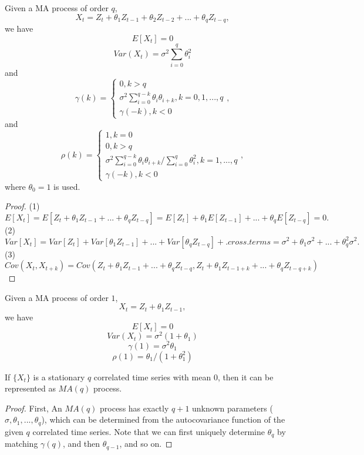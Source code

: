 \begin{theorem}\cite[33]{chatfield2003analysis}
Given a MA process of order $q$,
$$X_t = Z_t + \theta_1 Z_{t-1} + \theta_2 Z_{t-2} + ... + \theta_q Z_{t-q},$$
 we have 
$$E[X_t] = 0$$
$$Var(X_t) = \sigma^2 \sum_{i=0}^q \theta_i^2$$
and
$$\gamma(k) = \begin{cases} 
0,k>q\\
\sigma^2 \sum_{i=0}^{q-k}\theta_i\theta_{i+k},k=0,1,...,q\\
\gamma(-k),k<0
\end{cases},$$
and
$$\rho(k) = \begin{cases} 
1, k=0\\
0,k>q\\
\sigma^2 \sum_{i=0}^{q-k}\theta_i\theta_{i+k}/\sum_{i=0}^q \theta_i^2,k=1,...,q\\
\gamma(-k),k<0
\end{cases},$$
where $\theta_0 = 1$ is used.
\end{theorem}
\begin{proof}
(1) 
$$E[X_t] = E[Z_t + \theta_1 Z_{t-1} + ... + \theta_q Z_{t-q}] = E[Z_t] + \theta_1 E[Z_{t-1}] +  ... + \theta_q E[Z_{t-q}] = 0.$$
(2) $$Var[X_t] = Var[Z_t] + Var[\theta_1Z_{t-1}] + ... + Var[\theta_q Z_{t-q}] + .cross.terms = \sigma^2+\theta_1\sigma^2 + ... + \theta_q^2\sigma^2.$$
(3) $$Cov(X_t,X_{t+k}) = Cov(Z_t + \theta_1 Z_{t-1} + ... + \theta_q Z_{t-q},Z_t + \theta_1 Z_{t-1 + k} + ... + \theta_q Z_{t-q + k})$$
\end{proof}

\begin{corollary}
Given a MA process of order $1$,
$$X_t = Z_t + \theta_1 Z_{t-1},$$
we have 
$$E[X_t] = 0$$
$$Var(X_t) = \sigma^2(1 + \theta_1) $$
$$\gamma(1) = \sigma^2 \theta_1$$
$$\rho(1) = \theta_1/(1 + \theta_1^2)$$
\end{corollary}


\begin{theorem}
\cite[50]{brockwell2002introduction} If $\{X_t\}$ is a stationary $q$ correlated time series with mean $0$, then it can be represented as $MA(q)$ process.
\end{theorem}
\begin{proof}
First, An $MA(q)$ process has exactly $q+1$ unknown parameters ($\sigma,\theta_1,...,\theta_q$), which can be determined from the autocovariance function of the given $q$ correlated time series. 
Note that we can first uniquely determine $\theta_q$ by matching $\gamma(q)$, and then $\theta_{q-1}$, and so on.  
\end{proof}



